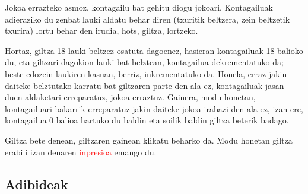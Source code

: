 \documentclass[dvipsnames]{../../../../AritzhClass}
\begin{document}
Jokoa errazteko asmoz, kontagailu bat gehitu diogu jokoari. Kontagailuak adieraziko du zenbat lauki aldatu behar diren (txuritik beltzera, zein beltzetik txurira) lortu behar den irudia, hots, giltza, lortzeko.

Hortaz, giltza 18 lauki beltzez osatuta dagoenez, hasieran kontagailuak 18 balioko du, eta giltzari dagokion lauki bat belztean, kontagailua dekrementatuko da; beste edozein laukiren kasuan, berriz, inkrementatuko da. Honela, erraz jakin daiteke belztutako karratu bat giltzaren parte den ala ez, kontagailuak jasan duen aldaketari erreparatuz, jokoa erraztuz. Gainera, modu honetan, kontagailuari bakarrik erreparatuz jakin daiteke jokoa irabazi den ala ez, izan ere, kontagailua 0 balioa hartuko du baldin eta soilik baldin giltza beterik badago.

Giltza bete denean, giltzaren gainean klikatu beharko da. Modu honetan giltza erabili izan denaren \textcolor{red}{inpresioa} emango du. 

\subsection{Adibideak}
\end{document}
